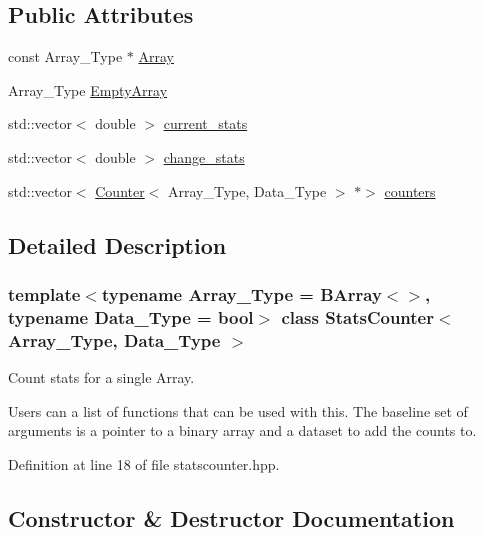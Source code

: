 \subsection*{Public Attributes}
\begin{DoxyCompactItemize}
\item 
const Array\+\_\+\+Type $\ast$ \hyperlink{class_stats_counter_aa826cd748cd3b1a57cbec52424285485}{Array}
\item 
Array\+\_\+\+Type \hyperlink{class_stats_counter_a026304bec607994865ba5bb4e18f9104}{Empty\+Array}
\item 
std\+::vector$<$ double $>$ \hyperlink{class_stats_counter_af98192f893280a2681a59f4b73051ca3}{current\+\_\+stats}
\item 
std\+::vector$<$ double $>$ \hyperlink{class_stats_counter_a42c926799d8cb0abc6f5a1cfbc073f69}{change\+\_\+stats}
\item 
std\+::vector$<$ \hyperlink{class_counter}{Counter}$<$ Array\+\_\+\+Type, Data\+\_\+\+Type $>$ $\ast$$>$ \hyperlink{class_stats_counter_ab81464f54ee44deedf3fb1f16f9b87c5}{counters}
\end{DoxyCompactItemize}


\subsection{Detailed Description}
\subsubsection*{template$<$typename Array\+\_\+\+Type = B\+Array$<$$>$, typename Data\+\_\+\+Type = bool$>$\newline
class Stats\+Counter$<$ Array\+\_\+\+Type, Data\+\_\+\+Type $>$}

Count stats for a single Array. 

Users can a list of functions that can be used with this. The baseline set of arguments is a pointer to a binary array and a dataset to add the counts to. 

Definition at line 18 of file statscounter.\+hpp.



\subsection{Constructor \& Destructor Documentation}
\mbox{\label{class_stats_counter_aad1531e93d2d217c5cfd6b389ccf6fba}} 
